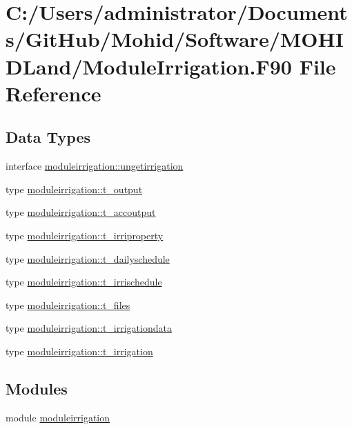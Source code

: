 \hypertarget{_module_irrigation_8_f90}{}\section{C\+:/\+Users/administrator/\+Documents/\+Git\+Hub/\+Mohid/\+Software/\+M\+O\+H\+I\+D\+Land/\+Module\+Irrigation.F90 File Reference}
\label{_module_irrigation_8_f90}
\subsection*{Data Types}
\begin{DoxyCompactItemize}
\item 
interface \mbox{\hyperlink{interfacemoduleirrigation_1_1ungetirrigation}{moduleirrigation\+::ungetirrigation}}
\item 
type \mbox{\hyperlink{structmoduleirrigation_1_1t__output}{moduleirrigation\+::t\+\_\+output}}
\item 
type \mbox{\hyperlink{structmoduleirrigation_1_1t__accoutput}{moduleirrigation\+::t\+\_\+accoutput}}
\item 
type \mbox{\hyperlink{structmoduleirrigation_1_1t__irriproperty}{moduleirrigation\+::t\+\_\+irriproperty}}
\item 
type \mbox{\hyperlink{structmoduleirrigation_1_1t__dailyschedule}{moduleirrigation\+::t\+\_\+dailyschedule}}
\item 
type \mbox{\hyperlink{structmoduleirrigation_1_1t__irrischedule}{moduleirrigation\+::t\+\_\+irrischedule}}
\item 
type \mbox{\hyperlink{structmoduleirrigation_1_1t__files}{moduleirrigation\+::t\+\_\+files}}
\item 
type \mbox{\hyperlink{structmoduleirrigation_1_1t__irrigationdata}{moduleirrigation\+::t\+\_\+irrigationdata}}
\item 
type \mbox{\hyperlink{structmoduleirrigation_1_1t__irrigation}{moduleirrigation\+::t\+\_\+irrigation}}
\end{DoxyCompactItemize}
\subsection*{Modules}
\begin{DoxyCompactItemize}
\item 
module \mbox{\hyperlink{namespacemoduleirrigation}{moduleirrigation}}
\end{DoxyCompactItemize}
